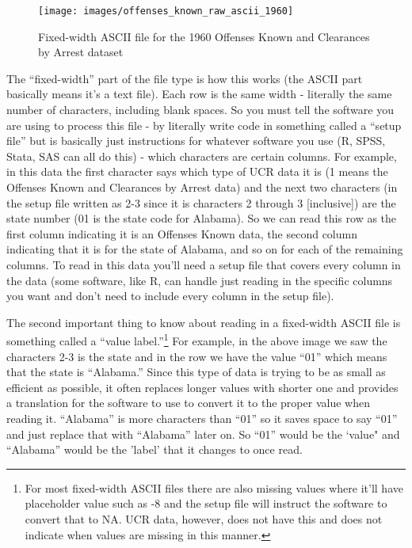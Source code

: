 \documentclass[
  12pt,
  openany]{book}
\begin{document}
\begin{figure}
\texttt{[image: images/offenses\_known\_raw\_ascii\_1960]} \caption{Fixed-width ASCII file for the 1960 Offenses Known and Clearances by Arrest dataset}\label{fig:unnamed-chunk-3}
\end{figure}

The ``fixed-width'' part of the file type is how this works (the ASCII part basically means it's a text file). Each row is the same width - literally the same number of characters, including blank spaces. So you must tell the software you are using to process this file - by literally write code in something called a ``setup file'' but is basically just instructions for whatever software you use (R, SPSS, Stata, SAS can all do this) - which characters are certain columns. For example, in this data the first character says which type of UCR data it is (1 means the Offenses Known and Clearances by Arrest data) and the next two characters (in the setup file written as 2-3 since it is characters 2 through 3 {[}inclusive{]}) are the state number (01 is the state code for Alabama). So we can read this row as the first column indicating it is an Offenses Known data, the second column indicating that it is for the state of Alabama, and so on for each of the remaining columns. To read in this data you'll need a setup file that covers every column in the data (some software, like R, can handle just reading in the specific columns you want and don't need to include every column in the setup file).

The second important thing to know about reading in a fixed-width ASCII file is something called a ``value label.''\footnote{For most fixed-width ASCII files there are also missing values where it'll have placeholder value such as -8 and the setup file will instruct the software to convert that to NA. UCR data, however, does not have this and does not indicate when values are missing in this manner.} For example, in the above image we saw the characters 2-3 is the state and in the row we have the value ``01'' which means that the state is ``Alabama.'' Since this type of data is trying to be as small as efficient as possible, it often replaces longer values with shorter one and provides a translation for the software to use to convert it to the proper value when reading it. ``Alabama'' is more characters than ``01'' so it saves space to say ``01'' and just replace that with ``Alabama'' later on. So ``01'' would be the `value" and ``Alabama'' would be the 'label' that it changes to once read.
\end{document}

